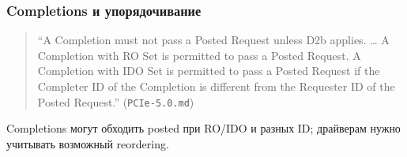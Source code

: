\documentclass[a4paper,12pt]{article}
\begin{document}
\subsubsection{Completions и упорядочивание}
\begin{quote}
``A Completion must not pass a Posted Request unless D2b applies. … A Completion with RO Set is permitted to pass a Posted Request. A Completion with IDO Set is permitted to pass a Posted Request if the Completer ID of the Completion is different from the Requester ID of the Posted Request.'' (\texttt{PCIe-5.0.md})
\end{quote}
Completions могут обходить posted при RO/IDO и разных ID; драйверам нужно учитывать возможный reordering.
\end{document}
